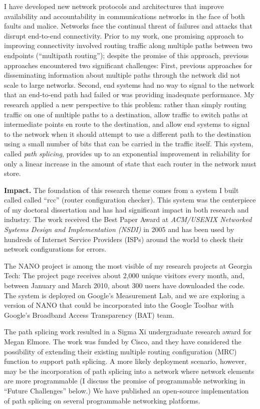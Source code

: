I have developed new network protocols and architectures that improve
availability and accountability in communications networks in the face
of both faults and malice.  Networks face the continual threat of
failures and attacks that disrupt end-to-end connectivity.  Prior to my
work, one promising approach to improving connectivity involved routing
traffic along multiple paths between two endpoints (``multipath
routing''); despite the promise of this approach, previous approaches
encountered two significant challenges: First, previous approaches for
disseminating information about multiple paths through the network did
not scale to large networks.  Second, end systems had no way to signal
to the network that an end-to-end path had failed or was providing
inadequate performance.  My research applied a new perspective to this
problem: rather than simply routing traffic on one of multiple paths to
a destination, allow traffic to switch paths at intermediate points en
route to the destination, and allow end systems to signal to the network
when it should attempt to use a different path to the destination using
a small number of bits that can be carried in the traffic itself.  This
system, called {\em path splicing}, provides up to an exponential
improvement in reliability for only a linear increase in the amount of
state that each router in the network must store.


{\bf Impact.} The foundation of this research theme comes from a system
I built called called ``rcc'' (router configuration checker).  This
system was the centerpiece of my doctoral dissertation and has had
significant impact in both research and industry.  The work received the
Best Paper Award at {\em ACM/USENIX Networked Systems Design and
Implementation (NSDI)} in 2005 and has been used by hundreds of Internet
Service Providers (ISPs) around the world to check their network
configurations for errors.

The NANO project is among the most visible of my research projects at
Georgia Tech: The project page receives about 2,000 unique visitors
every month, and, between January and March 2010, about 300 users have
downloaded the code.  The system is deployed on Google's Measurement
Lab, and we are exploring a version of NANO that could be incorporated
into the Google Toolbar with Google's Broadband Access Transparency
(BAT) team.

The path splicing work resulted in a Sigma Xi undergraduate research
award for Megan Elmore.  The work was funded by Cisco, and they have
considered the possibility of extending their existing multiple routing
configuration (MRC) function to support path splicing.  A more likely
deployment scenario, however, may be the incorporation of path splicing
into a network where network elements are more programmable (I discuss
the promise of programmable networking in ``Future Challenges'' below.)
We have published an open-source implementation of path splicing on
several programmable networking platforms.

